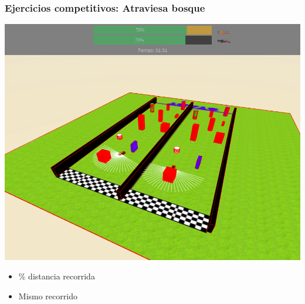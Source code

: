 \documentclass[xcolor={table}]{beamer}
\begin{document}
		\begin{frame}
			\frametitle{\LARGE{Ejercicios competitivos: Atraviesa bosque}}
			
	\begin{minipage}{.48\textwidth}
      \includegraphics[scale=0.18]{img/evaluador_forest.png}
        \end{minipage}
      \begin{minipage}{.50\textwidth}
      \begin{itemize}
      \begin{itemize}{}\itemsep5pt
          \item \% distancia recorrida
          \item Mismo recorrido 
      \end{itemize}
       \end{itemize}
    \end{minipage}
		\end{frame}
		
\end{document}
